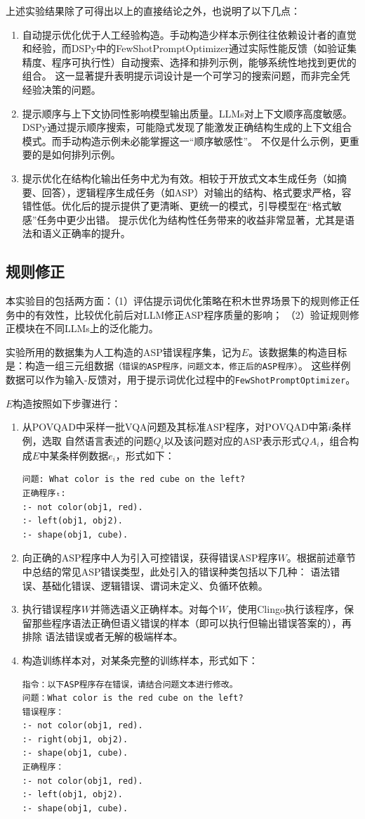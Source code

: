 上述实验结果除了可得出以上的直接结论之外，也说明了以下几点：
\begin{enumerate}[nosep]
\item 自动提示优化优于人工经验构造。手动构造少样本示例往往依赖设计者的直觉和经验，而DSPy中的FewShotPromptOptimizer通过实际性能反馈（如验证集精度、程序可执行性）自动搜索、选择和排列示例，能够系统性地找到更优的组合。
这一显著提升表明提示词设计是一个可学习的搜索问题，而非完全凭经验决策的问题。
\item 提示顺序与上下文协同性影响模型输出质量。LLMs对上下文顺序高度敏感。DSPy通过提示顺序搜索，可能隐式发现了能激发正确结构生成的上下文组合模式。而手动构造示例未必能掌握这一“顺序敏感性”。
不仅是什么示例，更重要的是如何排列示例。
\item 提示优化在结构化输出任务中尤为有效。相较于开放式文本生成任务（如摘要、回答），逻辑程序生成任务（如ASP）对输出的结构、格式要求严格，容错性低。优化后的提示提供了更清晰、更统一的模式，引导模型在“格式敏感”任务中更少出错。
提示优化为结构性任务带来的收益非常显著，尤其是语法和语义正确率的提升。
\end{enumerate}
\subsection{规则修正}
本实验目的包括两方面：（1）评估提示词优化策略在积木世界场景下的规则修正任务中的有效性，比较优化前后对LLM修正ASP程序质量的影响；
（2）验证规则修正模块在不同LLMs上的泛化能力。

实验所用的数据集为人工构造的ASP错误程序集，记为$E$。该数据集的构造目标是：构造一组三元组数据\texttt{（错误的ASP程序，问题文本，修正后的ASP程序）}。
这些样例数据可以作为输入-反馈对，用于提示词优化过程中的\texttt{FewShotPromptOptimizer}。

$E$构造按照如下步骤进行：
\begin{enumerate}[nosep]
\item 从POVQAD中采样一批VQA问题及其标准ASP程序，对POVQAD中第$i$条样例，选取
自然语言表述的问题$Q_i$以及该问题对应的ASP表示形式$QA_i$，组合构成$E$中某条样例数据$e_i$，形式如下：
\begin{lstlisting}
问题: What color is the red cube on the left?
正确程序ₜ:
:- not color(obj1, red).
:- left(obj1, obj2).
:- shape(obj1, cube).
\end{lstlisting}
\item 向正确的ASP程序中人为引入可控错误，获得错误ASP程序$W$。根据前述章节中总结的常见ASP错误类型，此处引入的错误种类包括以下几种：
语法错误、基础化错误、逻辑错误、谓词未定义、负循环依赖。
\item 执行错误程序$W$并筛选语义正确样本。对每个$W$，使用Clingo执行该程序，保留那些程序语法正确但语义错误的样本（即可以执行但输出错误答案的），再排除
语法错误或者无解的极端样本。
\item 构造训练样本对，对某条完整的训练样本，形式如下：
\begin{lstlisting}
指令：以下ASP程序存在错误，请结合问题文本进行修改。
问题：What color is the red cube on the left?
错误程序：
:- not color(obj1, red).
:- right(obj1, obj2). 
:- shape(obj1, cube).
正确程序：
:- not color(obj1, red).
:- left(obj1, obj2).
:- shape(obj1, cube).
\end{lstlisting}
\end{enumerate}

